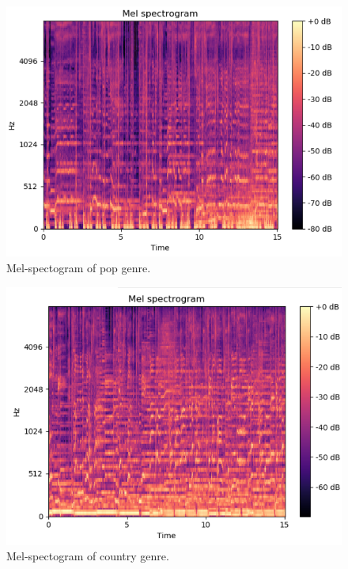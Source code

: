 \begin{figure}
\begin{center}
\includegraphics[scale=0.2]{./figures/pop.png}
\end{center}
\caption
{
Mel-spectogram of pop genre. 
}
\label{fig:big_picture3}
\end{figure}

\begin{figure}
\begin{center}
\includegraphics[scale=0.2]{./figures/country.png}
\end{center}
\caption
{
Mel-spectogram of country genre. 
}
\label{fig:big_picture4}
\end{figure}

